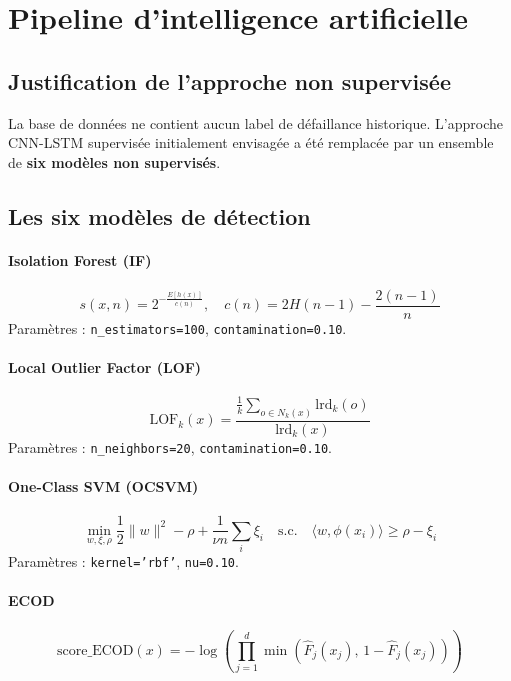 \documentclass[12pt,a4paper]{report}
\begin{document}
\section{Pipeline d'intelligence artificielle}

\subsection{Justification de l'approche non supervisée}

La base de données ne contient aucun label de défaillance historique. L'approche
CNN-LSTM supervisée initialement envisagée a été remplacée par un ensemble de
\textbf{six modèles non supervisés}.

\subsection{Les six modèles de détection}

\paragraph{Isolation Forest (IF)}
\begin{equation}
  s(x, n) = 2^{-\frac{E[h(x)]}{c(n)}}, \quad c(n) = 2H(n-1) - \frac{2(n-1)}{n}
\end{equation}
Paramètres : \texttt{n\_estimators=100}, \texttt{contamination=0.10}.

\paragraph{Local Outlier Factor (LOF)}
\begin{equation}
  \text{LOF}_k(x) = \frac{\frac{1}{k}\sum_{o \in N_k(x)} \text{lrd}_k(o)}{\text{lrd}_k(x)}
\end{equation}
Paramètres : \texttt{n\_neighbors=20}, \texttt{contamination=0.10}.

\paragraph{One-Class SVM (OCSVM)}
\begin{equation}
  \min_{w,\xi,\rho} \frac{1}{2}\|w\|^2 - \rho + \frac{1}{\nu n}\sum_i \xi_i
  \quad \text{s.c.} \quad \langle w, \phi(x_i)\rangle \geq \rho - \xi_i
\end{equation}
Paramètres : \texttt{kernel='rbf'}, \texttt{nu=0.10}.

\paragraph{ECOD}
\begin{equation}
  \text{score\_ECOD}(x) = -\log\!\left(\prod_{j=1}^{d} \min\!\left(\hat{F}_j(x_j),\, 1-\hat{F}_j(x_j)\right)\right)
\end{equation}
\end{document}
